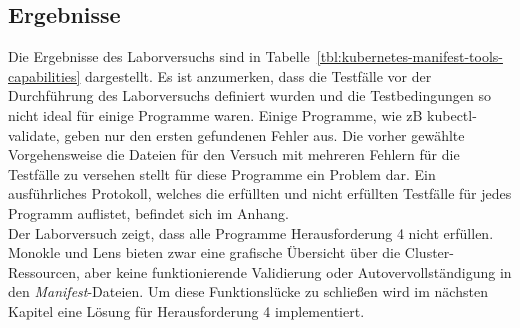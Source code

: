 \subsection{Ergebnisse}

Die Ergebnisse des Laborversuchs sind in Tabelle~\ref{tbl:kubernetes-manifest-tools-capabilities} dargestellt.
Es ist anzumerken, dass die Testfälle vor der Durchführung des Laborversuchs definiert wurden und die Testbedingungen so nicht
ideal für einige Programme waren. Einige Programme, wie \ac{zB} kubectl-validate, geben nur den ersten gefundenen Fehler aus.
Die vorher gewählte Vorgehensweise die Dateien für den Versuch mit mehreren Fehlern für die Testfälle zu versehen stellt für
diese Programme ein Problem dar. Ein ausführliches Protokoll, welches die erfüllten und nicht erfüllten Testfälle für jedes Programm
auflistet, befindet sich im Anhang. \\
Der Laborversuch zeigt, dass alle Programme Herausforderung 4 nicht erfüllen.
Monokle und Lens bieten zwar eine grafische Übersicht über die Cluster-Ressourcen, aber keine funktionierende
Validierung oder Autovervollständigung in den \textit{Manifest}-Dateien. Um diese Funktionslücke zu schließen wird im
nächsten Kapitel eine Lösung für Herausforderung 4 implementiert.

